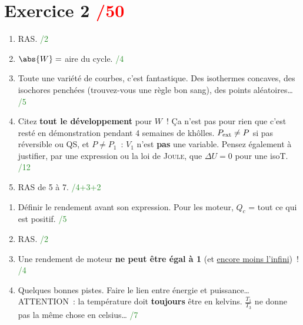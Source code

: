 \documentclass[a4paper, 11pt, final, garamond]{book}
\begin{document}
\section{Exercice 2 \hfill \textcolor{red}{/50}}
\begin{enumerate}
  \item RAS.
    \hfill \textcolor{ForestGreen}{/2}
  \item $\abs{W} =$ aire du cycle.
    \hfill \textcolor{ForestGreen}{/4}
  \item Toute une variété de courbes, c'est fantastique. Des isothermes
    concaves, des isochores penchées (trouvez-vous une règle bon sang), des
    points aléatoires…
    \hfill \textcolor{ForestGreen}{/5}
  \item Citez \textbf{tout le développement} pour $W$~! Ça n'est pas pour rien
    que c'est resté en démonstration pendant 4 semaines de khôlles. $P_{\rm ext}
    \neq P$ si pas réversible ou QS, et $P \neq P_1$~: $V_1$ n'est \textbf{pas}
    une variable. Pensez également à justifier, par une expression ou la loi de
    \textsc{Joule}, que $\Delta{U} = 0$ pour une isoT.
    \hfill \textcolor{ForestGreen}{/12}
  \item RAS de 5 à 7.
    \hfill \textcolor{ForestGreen}{/4+3+2}
\end{enumerate}
\begin{enumerate}[start=8]
  \item Définir le rendement avant son expression. Pour les moteur, $Q_c$ = tout
    ce qui est positif.
    \hfill \textcolor{ForestGreen}{/5}
  \item RAS.
    \hfill \textcolor{ForestGreen}{/2}
  \item Une rendement de moteur \textbf{ne peut être égal à 1} (et \ul{encore
    moins l'infini})~!
    \hfill \textcolor{ForestGreen}{/4}
  \item Quelques bonnes pistes. Faire le lien entre énergie et puissance…
    ATTENTION~: la température doit \textbf{toujours} être en kelvins.
    $\frac{T_1}{T_3}$ ne donne pas la même chose en celsius… \hfill
    \textcolor{ForestGreen}{/7}
\end{enumerate}
\end{document}
